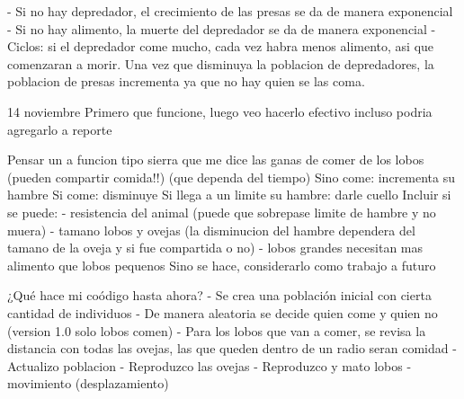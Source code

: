 - Si no hay depredador, el crecimiento de las presas se da de manera exponencial
- Si no hay alimento, la muerte del depredador se da de manera exponencial
- Ciclos: si el depredador come mucho, cada vez habra menos alimento, asi que comenzaran a morir. Una vez que disminuya la poblacion de depredadores, la poblacion de presas incrementa ya que no hay quien se las coma.


14 noviembre
Primero que funcione, luego veo hacerlo efectivo
incluso podria agregarlo a reporte

Pensar un a funcion tipo sierra que me dice las ganas de comer de los lobos (pueden compartir comida!!)
(que dependa del tiempo)
Sino come: incrementa su hambre 
Si come: disminuye
Si llega a un limite su hambre: darle cuello
Incluir si se puede:
- resistencia del animal (puede que sobrepase limite de hambre y no muera)
- tamano lobos y ovejas (la disminucion del hambre dependera del tamano de la oveja y si fue compartida o no)
- lobos grandes necesitan mas alimento que lobos pequenos
Sino se hace, considerarlo como trabajo a futuro

¿Qu\'e hace mi co\'odigo hasta ahora?
- Se crea una poblaci\'on inicial con cierta cantidad de individuos
- De manera aleatoria se decide quien come y quien no (version 1.0 solo lobos comen)
- Para los lobos que van a comer, se revisa la distancia con todas las ovejas, las que queden dentro de un radio seran comidad
- Actualizo poblacion
- Reproduzco las ovejas
- Reproduzco y mato lobos
- movimiento (desplazamiento)


